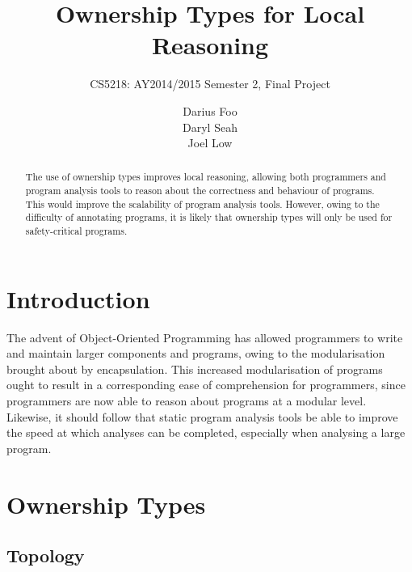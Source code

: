 \documentclass{acm_proc_article-sp}
\begin{document}
\title{Ownership Types for Local Reasoning}
\subtitle{CS5218: AY2014/2015 Semester 2, Final Project}


\author{
\alignauthor
Darius Foo\\
\alignauthor
Daryl Seah\\
\alignauthor
Joel Low\\
}



\maketitle
\begin{abstract}
The use of ownership types improves local reasoning, allowing both programmers 
and program analysis tools to reason about the correctness and behaviour of 
programs. This would improve the scalability of program analysis tools. 
However, owing to the difficulty of annotating programs, it is likely that 
ownership types will only be used for safety-critical programs.
\end{abstract}

\section{Introduction}
\label{sec:intro}

The advent of Object-Oriented Programming has allowed programmers to write and 
maintain larger components and programs, owing to the modularisation brought 
about by encapsulation. This increased modularisation of programs ought to 
result in a corresponding ease of comprehension for programmers, since 
programmers are now able to reason about programs at a modular level. 
Likewise, it should follow that static program analysis tools be able to 
improve the speed at which analyses can be completed, especially when analysing 
a large program.

\section{Ownership Types}
\label{sec:ownership}


\subsection{Topology}
\label{subsec:topo}
\end{document}

